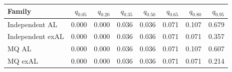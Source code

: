 \begin{tabular}{lrrrrrrr}
\toprule
Family & $q_{0.05}$ & $q_{0.20}$ & $q_{0.35}$ & $q_{0.50}$ & $q_{0.65}$ & $q_{0.80}$ & $q_{0.95}$ \\
\midrule
Independent AL & 0.000 & 0.000 & 0.036 & 0.036 & 0.071 & 0.107 & 0.679 \\
Independent exAL & 0.000 & 0.000 & 0.036 & 0.036 & 0.071 & 0.071 & 0.357 \\
MQ AL & 0.000 & 0.000 & 0.036 & 0.036 & 0.071 & 0.107 & 0.607 \\
MQ exAL & 0.000 & 0.000 & 0.036 & 0.036 & 0.071 & 0.071 & 0.214 \\
\bottomrule
\end{tabular}
